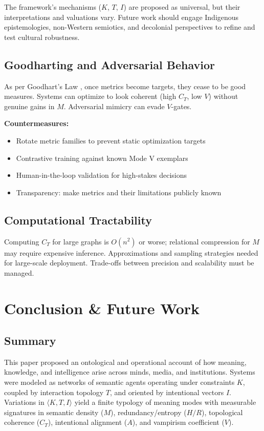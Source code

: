 \documentclass[12pt]{article}
\begin{document}
The framework's mechanisms ($K$, $T$, $I$) are proposed as universal, but their interpretations and valuations vary. Future work should engage Indigenous epistemologies, non-Western semiotics, and decolonial perspectives to refine and test cultural robustness.

\subsection{Goodharting and Adversarial Behavior}

As per Goodhart's Law \citep{goodhart1984problems}, once metrics become targets, they cease to be good measures. Systems can optimize to look coherent (high $C_T$, low $V$) without genuine gains in $M$. Adversarial mimicry can evade $V$-gates.

\textbf{Countermeasures:}
\begin{itemize}
\item Rotate metric families to prevent static optimization targets
\item Contrastive training against known Mode V exemplars
\item Human-in-the-loop validation for high-stakes decisions
\item Transparency: make metrics and their limitations publicly known
\end{itemize}

\subsection{Computational Tractability}

Computing $C_T$ for large graphs is $O(n^2)$ or worse; relational compression for $M$ may require expensive inference. Approximations and sampling strategies needed for large-scale deployment. Trade-offs between precision and scalability must be managed.

\section{Conclusion \& Future Work}
\label{sec:conclusion}

\subsection{Summary}

This paper proposed an ontological and operational account of how meaning, knowledge, and intelligence arise across minds, media, and institutions. Systems were modeled as networks of semantic agents operating under constraints $K$, coupled by interaction topology $T$, and oriented by intentional vectors $I$. Variations in $\langle K, T, I \rangle$ yield a finite typology of meaning modes with measurable signatures in semantic density ($M$), redundancy/entropy ($H/R$), topological coherence ($C_T$), intentional alignment ($A$), and vampirism coefficient ($V$).
\end{document}
